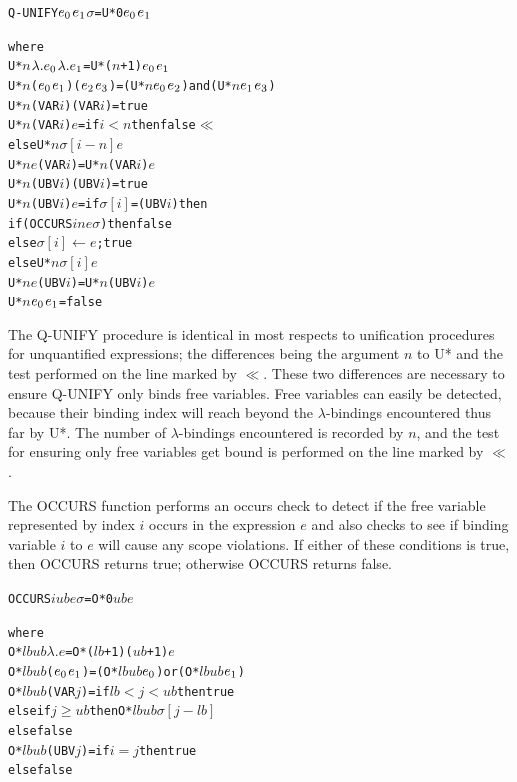 \begin{alltt}
Q-UNIFY \(e\sb{0}\) \(e\sb{1}\) \(\sigma\) = U* 0 \(e\sb{0}\) \(e\sb{1}\)

where
U* \(n\) \(\lambda.e\sb{0}\)     \(\lambda.e\sb{1}\)     =  U* (\(n\)+1) \(e\sb{0}\) \(e\sb{1}\)
U* \(n\) (\(e\sb{0}\) \(e\sb{1}\))   (\(e\sb{2}\) \(e\sb{3}\))   =  (U* \(n\) \(e\sb{0}\) \(e\sb{2}\)) and (U* \(n\) \(e\sb{1}\) \(e\sb{3}\))
U* \(n\) (VAR \(i\)) (VAR \(i\)) =  true
U* \(n\) (VAR \(i\)) \(e\)       =  if \(i < n\) then false                 \(\ll\)
                              else U* \(n\) \(\sigma[i-n]\) \(e\)
U* \(n\) \(e\)       (VAR \(i\)) =  U* \(n\) (VAR \(i\)) \(e\)
U* \(n\) (UBV \(i\)) (UBV \(i\)) =  true
U* \(n\) (UBV \(i\)) \(e\)       =  if \(\sigma[i]\) = (UBV \(i\)) then
                                if (OCCURS \(i\) \(n\) \(e\) \(\sigma\)) then false
                                else \(\sigma[i]\leftarrow e\); true
                              else U* \(n\) \(\sigma[i]\) \(e\)
U* \(n\) \(e\)       (UBV \(i\)) =  U* \(n\) (UBV \(i\)) \(e\)
U* \(n\) \(e\sb{0}\)     \(e\sb{1}\)     =  false
\end{alltt}

The Q-UNIFY procedure is identical in most respects to unification procedures
for unquantified expressions; the differences being the argument \(n\) to U*
and the test performed on the line marked by \(\ll\). These two differences are
necessary to ensure Q-UNIFY only binds free variables. Free variables can easily
be detected, because their binding index will reach beyond the
\(\lambda\)-bindings encountered thus far by U*. The number of
\(\lambda\)-bindings encountered is recorded by \(n\), and the test for ensuring
only free variables get bound is performed on the line marked by \(\ll\).

The OCCURS function performs an occurs check to detect if the free variable
represented by index \(i\) occurs in the expression \(e\) and also checks to see
if binding variable \(i\) to \(e\) will cause any scope violations. If either
of these conditions is true, then OCCURS returns true; otherwise OCCURS returns
false.

\begin{alltt}
OCCURS \(i\) \(ub\) \(e\) \(\sigma\) = O* 0 \(ub\) \(e\)

where
O* \(lb\) \(ub\) \(\lambda.e\)       =  O* (\(lb\)+1) (\(ub\)+1) \(e\)
O* \(lb\) \(ub\) (\(e\sb{0}\) \(e\sb{1}\))   =  (O* \(lb\) \(ub\) \(e\sb{0}\)) or (O* \(lb\) \(ub\) \(e\sb{1}\))
O* \(lb\) \(ub\) (VAR \(j\))     =  if \(lb < j < ub\) then true
                              else if \(j \geq ub\) then O* \(lb\) \(ub\) \(\sigma[j-lb]\)
                              else false
O* \(lb\) \(ub\) (UBV \(j\))     =  if \(i = j\) then true
                              else false
\end{alltt}

